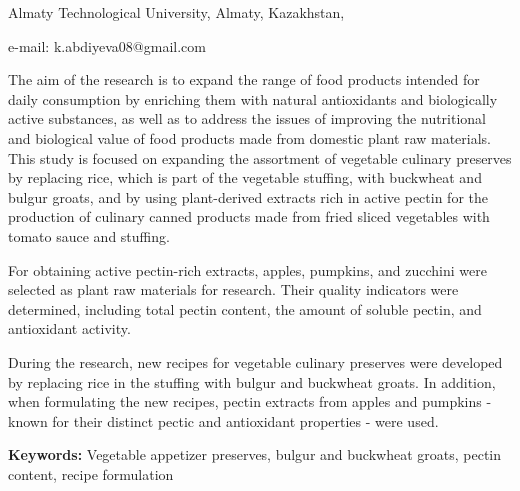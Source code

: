 \begin{affiliation}
Almaty Technological University, Almaty, Kazakhstan,

e-mail: k.abdiyeva08@gmail.com
\end{affiliation}

The aim of the research is to expand the range of food products intended
for daily consumption by enriching them with natural antioxidants and
biologically active substances, as well as to address the issues of
improving the nutritional and biological value of food products made
from domestic plant raw materials. This study is focused on expanding
the assortment of vegetable culinary preserves by replacing rice, which
is part of the vegetable stuffing, with buckwheat and bulgur groats, and
by using plant-derived extracts rich in active pectin for the production
of culinary canned products made from fried sliced vegetables with
tomato sauce and stuffing.

For obtaining active pectin-rich extracts, apples, pumpkins, and
zucchini were selected as plant raw materials for research. Their
quality indicators were determined, including total pectin content, the
amount of soluble pectin, and antioxidant activity.

During the research, new recipes for vegetable culinary preserves were
developed by replacing rice in the stuffing with bulgur and buckwheat
groats. In addition, when formulating the new recipes, pectin extracts
from apples and pumpkins - known for their distinct pectic and
antioxidant properties - were used.

{\bfseries Keywords:} Vegetable appetizer preserves, bulgur and buckwheat
groats, pectin content, recipe formulat\-ion

